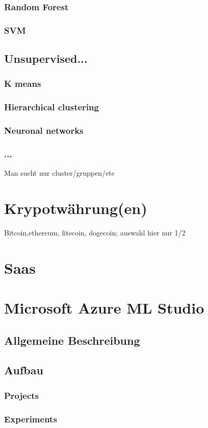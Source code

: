 \subsubsection{Random Forest}
\subsubsection{SVM}
\subsection{Unsupervised...}
\subsubsection{K means}
\subsubsection{Hierarchical clustering}
\subsubsection{Neuronal networks}
\subsubsection{...}
Man sucht nur cluster/gruppen/etc
\section{Krypotwährung(en)}
Bitcoin,ethereum, litecoin, dogecoin; auswahl hier nur 1/2
\section{Saas}
\section{Microsoft Azure ML Studio}
\subsection{Allgemeine Beschreibung}
\subsection{Aufbau }
\subsubsection{Projects}
\subsubsection{Experiments}
